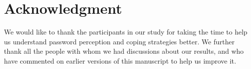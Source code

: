 \section*{Acknowledgment}
We would like to thank the participants in our study for taking the time to help us understand password perception and coping strategies better. We further thank all the people with whom we had discussions about our results, and who have commented on earlier versions of this manuscript to help us improve it.  
